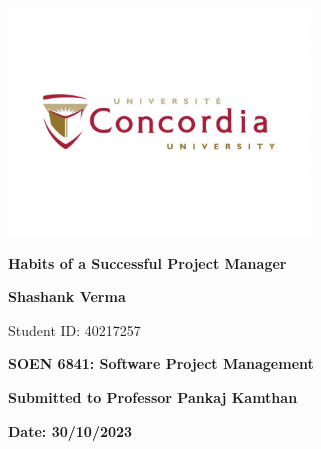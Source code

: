 \documentclass{article}
\begin{document}
\begin{titlepage}
    \centering
    \vspace*{1cm}
    \includegraphics[width=0.6\textwidth]{Logo.jpg} %
    \par\vspace{0.5cm}
    {\Huge\textbf{Habits of a Successful Project Manager}\par}
    \vspace{1.5cm}
    {\Large\textbf{Shashank Verma}\par}
    \vspace{0.5cm}
    {Student ID: 40217257\par}
    \vspace{2cm}
    {\Large\textbf{SOEN 6841: Software Project Management}\par}
    \vspace{1cm}
    {\large\textbf{Submitted to Professor Pankaj Kamthan}\par} %
    \vfill
    {\large\textbf{Date: 30/10/2023}\par}
\end{titlepage}

\newpage
\tableofcontents
\newpage
{}
\end{document}
